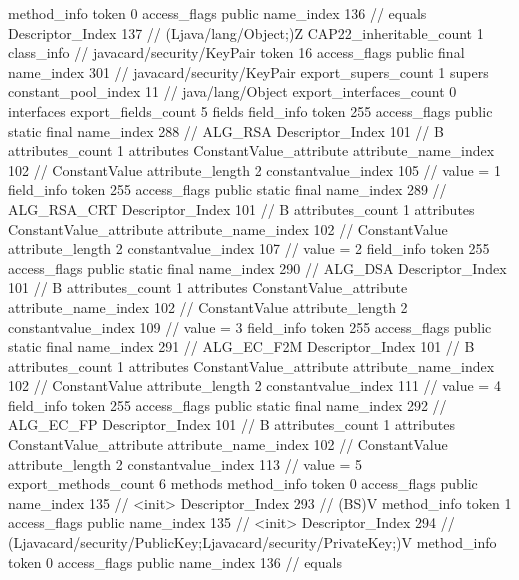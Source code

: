 {{{{				method_info {
					token	0
					access_flags	public
					name_index	136		// equals
					Descriptor_Index	137		// (Ljava/lang/Object;)Z
				}
			}
			CAP22_inheritable_count	1
		}
		class_info {		// javacard/security/KeyPair
			token	16
			access_flags	public final
			name_index	301		// javacard/security/KeyPair
			export_supers_count	1
			supers {
				constant_pool_index	11		// java/lang/Object
			}
			export_interfaces_count	0
			interfaces {
			}
			export_fields_count	5
			fields {
			field_info {
				token	255
				access_flags	public static final
				name_index	288		// ALG_RSA
				Descriptor_Index	101		// B
				attributes_count	1
				attributes {
				ConstantValue_attribute {
					attribute_name_index	102		// ConstantValue
					attribute_length	2
					constantvalue_index	105		// value = 1
				}
				}
			}
			field_info {
				token	255
				access_flags	public static final
				name_index	289		// ALG_RSA_CRT
				Descriptor_Index	101		// B
				attributes_count	1
				attributes {
				ConstantValue_attribute {
					attribute_name_index	102		// ConstantValue
					attribute_length	2
					constantvalue_index	107		// value = 2
				}
				}
			}
			field_info {
				token	255
				access_flags	public static final
				name_index	290		// ALG_DSA
				Descriptor_Index	101		// B
				attributes_count	1
				attributes {
				ConstantValue_attribute {
					attribute_name_index	102		// ConstantValue
					attribute_length	2
					constantvalue_index	109		// value = 3
				}
				}
			}
			field_info {
				token	255
				access_flags	public static final
				name_index	291		// ALG_EC_F2M
				Descriptor_Index	101		// B
				attributes_count	1
				attributes {
				ConstantValue_attribute {
					attribute_name_index	102		// ConstantValue
					attribute_length	2
					constantvalue_index	111		// value = 4
				}
				}
			}
			field_info {
				token	255
				access_flags	public static final
				name_index	292		// ALG_EC_FP
				Descriptor_Index	101		// B
				attributes_count	1
				attributes {
				ConstantValue_attribute {
					attribute_name_index	102		// ConstantValue
					attribute_length	2
					constantvalue_index	113		// value = 5
				}
				}
			}
			}
			export_methods_count	6
			methods {
				method_info {
					token	0
					access_flags	public
					name_index	135		// <init>
					Descriptor_Index	293		// (BS)V
				}
				method_info {
					token	1
					access_flags	public
					name_index	135		// <init>
					Descriptor_Index	294		// (Ljavacard/security/PublicKey;Ljavacard/security/PrivateKey;)V
				}
				method_info {
					token	0
					access_flags	public
					name_index	136		// equals
}}}}}
